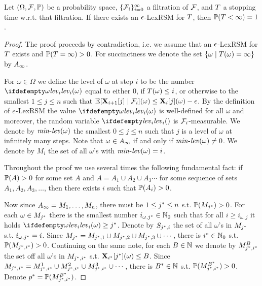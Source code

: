 \begin{theorem}
Let $(\Omega,\mathcal{F},\mathbb{P})$ be a probability space, 
$\{\mathcal{F}_i\}_{i=0}^{\infty}$ a filtration of $\mathcal{F}$, and $T$ a 
stopping 
time w.r.t. that filtration. If there exists an $\epsilon$-LexRSM for $T$, 
then $\mathbb{P}(T<\infty)=1$.
\end{theorem}
\begin{proof}
The proof proceeds by contradiction, i.e. we assume that an $\epsilon$-LexRSM for 
$T$ exists and $\mathbb{P}(T=\infty)>0$. For succinctness we denote the 
set $\{\omega\mid T(\omega)=\infty\}$ by $A_{\infty}$.

For $\omega\in \Omega$ we define the level of $\omega$ at step $i$ to be the 
number $\levelrank{\omega}{i}$ equal to either $0$, if $T(\omega)\leq i$, 
or otherwise to the smallest $1\leq j \leq n$ such that 
$\mathbb{E}[\mathbf{X}_{i+1}[j]\mid 
\mathcal{F}_i](\omega)\leq\mathbf{X}_{i}[j](\omega)-\epsilon$. By the definition of 
$\epsilon$-LexRSM the value $\levelrank{\omega}{i}$ is well-defined for all 
$\omega$ and moreover, the random variable $\levelrank{}{i}$ is $\mathcal{F}_i$-measurable. We denote by $\mathit{min}\text{-}\mathit{lev}(\omega)$ the smallest $0 \leq j \leq n$ such 
that $j$ is a level of $\omega$ at infinitely many steps. Note that $\omega \in 
A_{\infty}$ if and only if $\mathit{min}\text{-}\mathit{lev}(\omega)\neq 0$. We denote by $M_i$ 
the set of all $\omega$'s with $\mathit{min}\text{-}\mathit{lev}(\omega)=i$.

Throughout the proof we use several times the following fundamental fact: if 
$\mathbb{P}(A)>0$ for some set $A$ and $A=A_1\cup A_2 \cup A_3\cdots$ for some 
sequence of sets $A_1,A_2,A_3,\dots$, then there exists $i$ such that 
$\mathbb{P}(A_i)>0$.

Now since $A_{\infty}=M_1,\dots,M_n$, there must be $1\leq {j}^* \leq n$ 
s.t. $\mathbb{P}(M_{{j}^*})>0$. For each $\omega\in M_{{j}^*}$ there is the smallest number
${i}_{\omega,{j}^*}\in\mathbb{N}_0$ such that for all $i\geq {i}_{\omega,{j}}$ it holds 
$\levelrank{\omega}{i}\geq \fixn{j}$. Denote by $S_{{j}^*,{i}}$ the set of all $\omega$'s in $M_{{j}^*}$ s.t. 
$i_{\omega,{j}^*}={i}$. 
Since $M_{{j}^*} = M_{{j}^*,1} \cup M_{{j}^*,2} \cup M_{{j}^*,3} \cup \cdots$, there is ${i}^*\in 
\mathbb{N}_0$ 
s.t. 
$\mathbb{P}(M_{{j}^*,{i}^*})>0$. Continuing on the same note, for each $B\in \mathbb{N}$ we 
denote by $M_{{j}^*,{i}^*}^{B}$ the set off all $\omega$'s in $M_{{j}^*,{i}^*}$ s.t. 
$\mathbf{X}_{{i}^*}[{j}^*](\omega)\leq B$. Since $M_{{j}^*,{i}^*}= M_{{j}^*,{i}^*}^{1} \cup M_{{j}^*,{i}^*}^{2} 
\cup M_{{j}^*,{i}^*}^{3} \cup \cdots  $, there is ${B}^*\in \mathbb{N}$ s.t. 
$\mathbb{P}(M_{{j}^*,{i}^*}^{{B}^*})>0$. Denote ${p}^*=\mathbb{P}(M_{{j}^*,{i}^*}^{{B}^*})$.


\end{proof}
